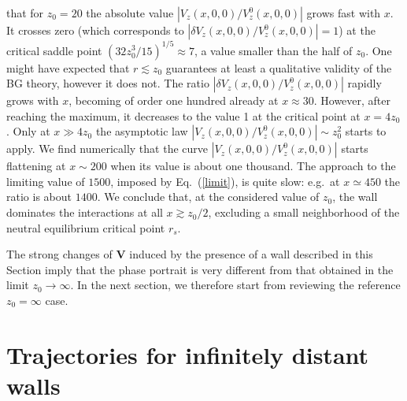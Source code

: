 that for $z_0=20$ the absolute value $|V_z(x, 0, 0)/V_z^0(x, 0, 0)|$ grows fast with $x$. It crosses zero (which corresponds to $|\delta V_z(x, 0, 0)/V^0_z(x, 0, 0)|=1$) at the critical saddle point $(32 z_0^3/15)^{1/5}\approx 7$, a value smaller than the half of $z_0$. One might have expected that $r\lesssim z_0$ guarantees at least a qualitative validity of the BG theory, however it does not. The ratio $|\delta V_z(x, 0, 0)/V^0_z(x, 0, 0)|$ rapidly grows with $x$, becoming of order one hundred already at $x \approx 30$. However, after reaching the maximum, it decreases to the value 1 at the critical point at $x=4z_0$. Only at $x\gg 4z_0$ the asymptotic law $|V_z(x, 0, 0)/V_z^0(x, 0, 0)| \sim z_0^2$ starts to apply. We find numerically that the curve $|V_z(x, 0, 0)/V_z^0(x, 0, 0)|$ starts flattening at $x\sim 200$ when its value is about one thousand. The approach to the limiting value of $1500$, imposed by Eq.~(\ref{limit}), is quite slow: e.g.\ at $x\simeq 450$ the ratio is about $1400$. We conclude that, at the considered value of $z_0$, the wall dominates the interactions at all $x\gtrsim z_0/2$, excluding a small neighborhood of the neutral equilibrium critical point $r_s$.

The strong changes of $\bm V$ induced by the presence of a wall described in this Section imply that the phase portrait is very different from that obtained in the limit $z_0
\to  \infty$. In the next section, we therefore start from reviewing the reference $z_0=\infty$ case.


\section{Trajectories for infinitely distant walls}\label{infinitely}


